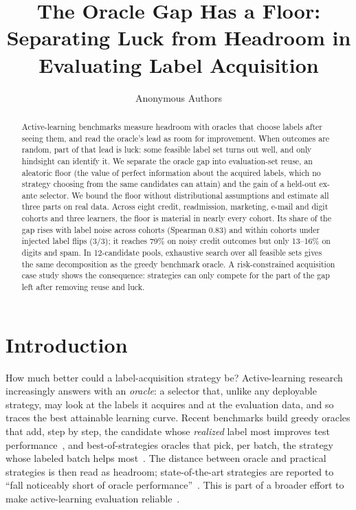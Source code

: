\documentclass[runningheads]{llncs}
\begin{document}
\title{The Oracle Gap Has a Floor: Separating Luck from Headroom in Evaluating Label Acquisition}
\author{Anonymous Authors}
\maketitle

\begin{abstract}
Active-learning benchmarks measure headroom with oracles that choose labels after seeing them, and read the oracle's lead as room for improvement. When outcomes are random, part of that lead is luck: some feasible label set turns out well, and only hindsight can identify it. We separate the oracle gap into evaluation-set reuse, an aleatoric floor (the value of perfect information about the acquired labels, which no strategy choosing from the same candidates can attain) and the gain of a held-out ex-ante selector. We bound the floor without distributional assumptions and estimate all three parts on real data. Across eight credit, readmission, marketing, e-mail and digit cohorts and three learners, the floor is material in nearly every cohort. Its share of the gap rises with label noise across cohorts (Spearman $0.83$) and within cohorts under injected label flips (3/3); it reaches 79\% on noisy credit outcomes but only 13--16\% on digits and spam. In 12-candidate pools, exhaustive search over all feasible sets gives the same decomposition as the greedy benchmark oracle. A risk-constrained acquisition case study shows the consequence: strategies can only compete for the part of the gap left after removing reuse and luck.
\end{abstract}

\section{Introduction}
\label{sec:intro}
How much better could a label-acquisition strategy be? Active-learning research increasingly answers with an \emph{oracle}: a selector that, unlike any deployable strategy, may look at the labels it acquires and at the evaluation data, and so traces the best attainable learning curve. Recent benchmarks build greedy oracles that add, step by step, the candidate whose \emph{realized} label most improves test performance~\cite{werner2023comparable,werner2024cdalbench}, and best-of-strategies oracles that pick, per batch, the strategy whose labeled batch helps most~\cite{huseljic2026boss}. The distance between oracle and practical strategies is then read as headroom; state-of-the-art strategies are reported to ``fall noticeably short of oracle performance''~\cite{huseljic2026boss}. This is part of a broader effort to make active-learning evaluation reliable~\cite{luth2023navigating,ji2023randomness}.
\end{document}
